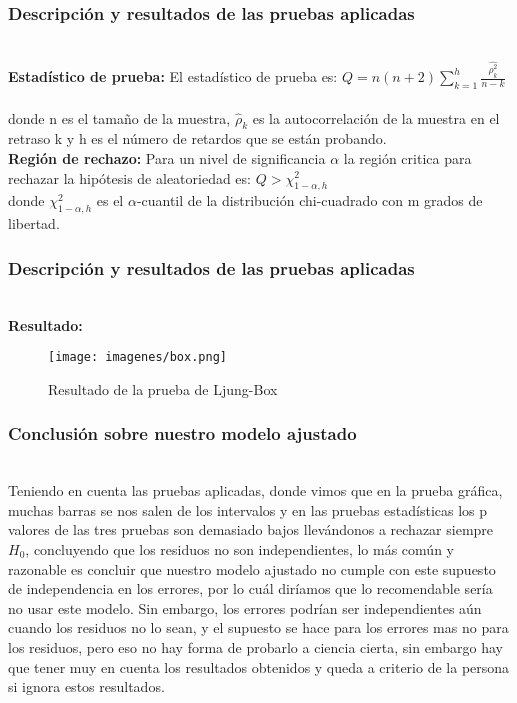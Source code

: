 \documentclass[12pt]{beamer}
\begin{document}
\begin{frame}
\frametitle{Descripción y resultados de las pruebas aplicadas}
~\\ \textbf{Estadístico de prueba:} El estadístico de prueba es: $Q=n(n+2)\sum\limits_{k=1}^{h}\frac{\hat{\rho_{k}^{2}}}{n-k}$
~\\ donde n es el tamaño de la muestra, $\displaystyle {\hat {\rho }}_{k}$  es la autocorrelación de la muestra en el retraso k y h es el número de retardos que se están probando.
~\\ \textbf{Región de rechazo:} Para un nivel de significancia $\alpha$ la región critica para rechazar la hipótesis de aleatoriedad es: $Q>\chi^{2}_{1-\alpha,h}$
~\\donde $\displaystyle \chi _{1-\alpha ,h}^{2}$ es el $\alpha$-cuantil de la distribución chi-cuadrado con m grados de libertad.
\end{frame}

\begin{frame}
\frametitle{Descripción y resultados de las pruebas aplicadas}
~\\ \textbf{Resultado:}\begin{figure}[!h]
    \begin{center}
        \texttt{[image: imagenes/box.png]}
        \caption{Resultado de la prueba de Ljung-Box}
        \label{fig:Densidad}
    \end{center}
\end{figure}
\end{frame}

\begin{frame}
\frametitle{Conclusión sobre nuestro modelo ajustado}
~\\Teniendo en cuenta las pruebas aplicadas, donde vimos que en la prueba gráfica, muchas barras se nos salen de los intervalos y en las pruebas estadísticas los p valores de las tres pruebas son demasiado bajos llevándonos a rechazar siempre $H_{0}$, concluyendo que los residuos no son independientes, lo más común y razonable es concluir que nuestro modelo ajustado no cumple con este supuesto de independencia en los errores, por lo cuál diríamos que lo recomendable sería no usar este modelo. Sin embargo, los errores podrían ser independientes aún cuando los residuos no lo sean, y el supuesto se hace para los errores mas no para los residuos, pero eso no hay forma de probarlo a ciencia cierta, sin embargo hay que tener muy en cuenta los resultados obtenidos y queda a criterio de la persona si ignora estos resultados.
\end{frame}
\end{document}
